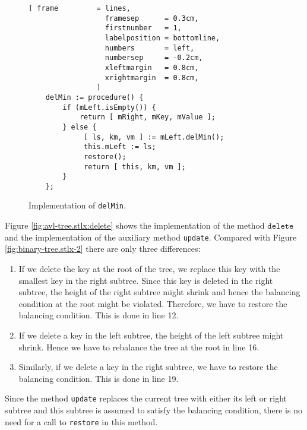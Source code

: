 \begin{figure}[!ht]
\centering
\begin{Verbatim}[ frame         = lines, 
                  framesep      = 0.3cm, 
                  firstnumber   = 1,
                  labelposition = bottomline,
                  numbers       = left,
                  numbersep     = -0.2cm,
                  xleftmargin   = 0.8cm,
                  xrightmargin  = 0.8cm,
                ]
    delMin := procedure() {
        if (mLeft.isEmpty()) { 
            return [ mRight, mKey, mValue ]; 
        } else {
             [ ls, km, vm ] := mLeft.delMin();
             this.mLeft := ls;
             restore();
             return [ this, km, vm ];
        }
    };
\end{Verbatim}
\vspace*{-0.3cm}
\caption{Implementation of \texttt{delMin}.}
\label{fig:avl-tree.stlx:delMin}
\end{figure}

\pagebreak
Figure \ref{fig:avl-tree.stlx:delete} shows the implementation of the method $\mathtt{delete}$ and the
implementation of the auxiliary method \texttt{update}.  Compared with Figure
\ref{fig:binary-tree.stlx-2} there are only three differences:
\begin{enumerate}
\item If we delete the key at the root of the tree, we replace this key with the smallest key in the
      right subtree. Since this key is deleted in the right subtree, the height of the right
      subtree might shrink and hence the balancing condition at the root might be violated.
      Therefore, we have to restore the balancing condition.  This is done in line 12.
\item If we delete a key in the left subtree, the height of the left subtree might shrink.
      Hence we have to rebalance the tree at the root in line 16.
\item Similarly, if we delete a key in the right subtree, we have to restore the balancing
      condition.  This is done in line 19.
\end{enumerate}
Since the method \texttt{update} replaces the current tree with either its left or right subtree and this
subtree is assumed to satisfy the balancing condition, there is no need for a call to \texttt{restore} in this
method. 

